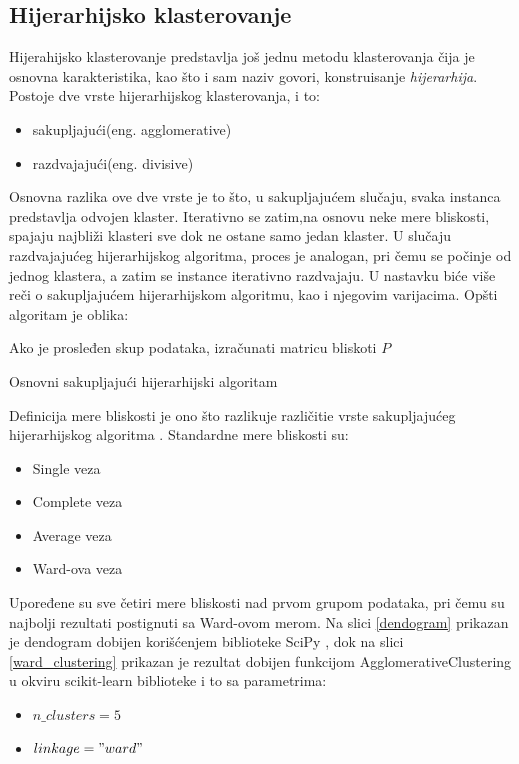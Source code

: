 \documentclass[a4paper]{article}
\begin{document}
\subsection{Hijerarhijsko klasterovanje}

Hijerahijsko klasterovanje predstavlja još jednu metodu klasterovanja čija je osnovna karakteristika, kao što i sam naziv govori, konstruisanje \textit{hijerarhija}. Postoje dve vrste hijerarhijskog klasterovanja, i to:
\begin{itemize}
\item sakupljajući(eng. agglomerative)
\item razdvajajući(eng. divisive)
\end{itemize}

Osnovna razlika ove dve vrste je to što, u sakupljajućem slučaju, svaka instanca predstavlja odvojen klaster. Iterativno se zatim,na osnovu neke mere bliskosti, spajaju najbliži klasteri sve dok ne ostane samo jedan klaster. U slučaju razdvajajućeg hijerarhijskog algoritma, proces je analogan, pri čemu se počinje od jednog klastera, a zatim se instance iterativno razdvajaju.
U nastavku biće više reči o sakupljajućem hijerarhijskom algoritmu, kao i njegovim varijacima. Opšti algoritam je oblika:

\begin{minipage}{1\linewidth}%
\begin{algorithm}[H]
\SetAlgoLined
{}
Ako je prosleđen skup podataka, izračunati matricu bliskoti $P$\;
 \caption{Osnovni sakupljajući hijerarhijski algoritam}
\end{algorithm}
\end{minipage}

\verb||

Definicija mere bliskosti je ono što razlikuje različitie vrste sakupljajućeg hijerarhijskog algoritma \cite{tan2016introduction}. Standardne mere bliskosti su:
\begin{itemize}
\item Single veza
\item Complete veza
\item Average veza
\item Ward-ova veza
\end{itemize}

Upoređene su sve četiri mere bliskosti nad prvom grupom podataka, pri čemu su najbolji rezultati postignuti sa Ward-ovom merom. Na slici \ref{dendogram} prikazan je dendogram dobijen korišćenjem biblioteke SciPy \cite{2020SciPy-NMeth}, dok na slici \ref{ward_clustering} prikazan je rezultat dobijen funkcijom AgglomerativeClustering u okviru scikit-learn biblioteke i to sa parametrima:
\begin{itemize}
\item $n\_clusters = 5$
\item $linkage = "ward"$
\end{itemize}
\end{document}
